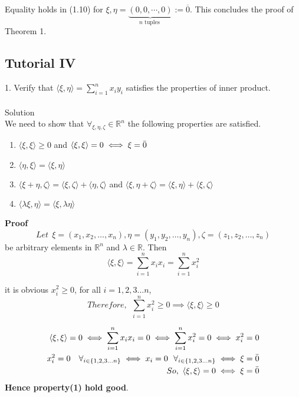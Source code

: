 \documentclass{article}
\begin{document}
Equality holds in (1.10) for $\xi, \eta=\underbrace{(0,0, \cdots, 0)}_{n \text { tuples }}:=\overline{0}$. This concludes the proof of Theorem 1. \newpage
\subsection{Tutorial IV}
\large{}
1. Verify that $
\langle\xi, \eta\rangle=\sum_{i=1}^{n} x_{i} y_{i}$
satisfies the properties of inner product.\\\\
\Large{Solution}\\
We need to show that $\forall_{\xi,\eta,\zeta}\in \mathbb{R}^n$ the following properties are satisfied.
\begin{enumerate}
  \item $\langle\xi, \xi\rangle \geq 0$ and $\langle\xi, \xi\rangle= 0 \iff \xi= \Bar{0}$
  \item $\langle\eta, \xi\rangle=\langle\xi, \eta\rangle$
  \item $\langle\xi+\eta, \zeta\rangle =\langle\xi, \zeta\rangle+\langle\eta, \zeta\rangle$ and $\langle\xi, \eta+\zeta\rangle=\langle\xi, \eta\rangle +\langle\xi,\zeta\rangle$
   \item $\langle\lambda \xi, \eta\rangle=\langle\xi, \lambda \eta\rangle $
  
\end{enumerate}
 \textbf{Proof}
$$Let~~\xi=\left(x_{1}, x_{2}, \ldots, x_{n}\right), \eta=\left(y_{1}, y_{2}, \ldots, y_{n}\right), \zeta=\left(z_{1}, z_{2}, \ldots, z_{n}\right)$$ be arbitrary elements in $\mathbb{R}^{n}$ and $\lambda \in \mathbb{R}$. Then
$$
\langle\xi, \xi\rangle=\sum_{i=1}^{n} x_{i} x_{i}=\sum_{i=1}^{n} x_{i}^{2}
$$

it is obvious $x_{i}^{2} \geq 0$, for all $i=1, 2, 3...n$,\\

 $$Therefore,~~\sum_{i=1}^{n} x_{i}^{2} \geq 0 \implies \langle\xi, \xi\rangle \geq 0$$

$$
\begin{aligned}
\langle\xi, \xi\rangle=0 \iff \sum_{i=1}^{n} x_{i} x_{i}=0 \iff \sum_{i=1}^{n} x_{i}^{2}=0 \iff x_{i}^{2}=0\\
x_{i}^{2}=0~~~ \forall_{i \in \{1,2,3...n\}} \iff x_i=0~~ \forall_{i \in \{1,2,3...n\}} \iff \xi=\Bar{0}\\
So,~ \langle\xi, \xi\rangle=0 \iff \xi=\Bar{0} 
\end{aligned}
$$
\textbf{Hence property(1) hold good}.
\end{document}
